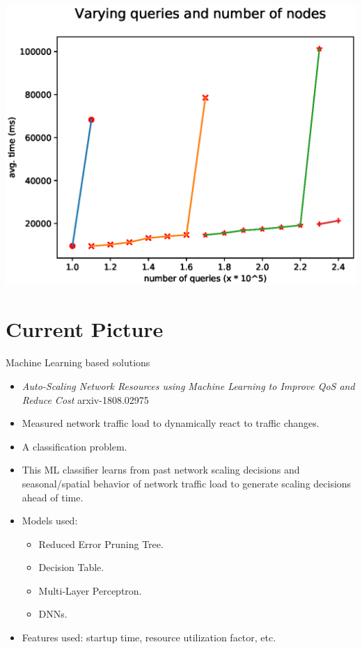\documentclass{beamer}
\begin{document}
\begin{frame}
    \includegraphics[width=\textwidth]{fig8.eps}
\end{frame}

\section{Current Picture}

\begin{frame}{Machine Learning based solutions}
\begin{itemize}
    \item \textit{Auto-Scaling Network Resources using Machine Learning to Improve QoS and Reduce Cost} arxiv-1808.02975
    \item Measured network traffic load to dynamically react to traffic changes.
    \item A classification problem.
    \item This ML classifier learns from past network scaling decisions and seasonal/spatial
            behavior of network traffic load to generate scaling decisions ahead of time. 
    \item Models used:
        \begin{itemize}
                \item Reduced Error Pruning Tree.
                \item Decision Table.
                \item Multi-Layer Perceptron.
                \item DNNs.
        \end{itemize}
    \item Features used:  startup time, resource utilization factor, etc.
\end{itemize}
\end{frame}
\end{document}
